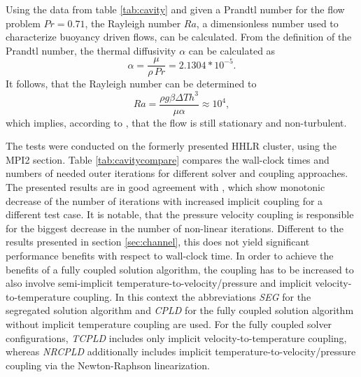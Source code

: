 Using the data from table \ref{tab:cavity} and given a Prandtl number for the flow problem \(Pr = 0.71\), the Rayleigh number \(Ra\), a dimensionless number used to characterize buoyancy driven flows, can be calculated. From the definition of the Prandtl number, the thermal diffusivity \(\alpha\) can be calculated as
\begin{displaymath}
  \alpha = \frac{\mu}{\rho \, Pr} = 2.1304 * 10^{-5}.
\end{displaymath}
It follows, that the Rayleigh number can be determined to 
\begin{displaymath}
  Ra = \frac{\rho g \beta \Delta T h^3}{\mu \alpha} \approx 10^4,
\end{displaymath}
which implies, according to \cite{christon02}, that the flow is still stationary and non-turbulent.

The tests were conducted on the formerly presented HHLR cluster, using the MPI2 section. Table \ref{tab:cavitycompare} compares the wall-clock times and numbers of needed outer iterations for different solver and coupling approaches. The presented results are in good agreement with \cite{vakilipour12}, which show monotonic decrease of the number of iterations with increased implicit coupling for a different test case. It is notable, that the pressure velocity coupling is responsible for the biggest decrease in the number of non-linear iterations. Different to the results presented in section \ref{sec:channel}, this does not yield significant performance benefits with respect to wall-clock time. In order to achieve the benefits of a fully coupled solution algorithm, the coupling has to be increased to also involve semi-implicit temperature-to-velocity/pressure and implicit velocity-to-temperature coupling. In this context the abbreviations \emph{SEG} for the segregated solution algorithm and \emph{CPLD} for the fully coupled solution algorithm without implicit temperature coupling are used. For the fully coupled solver configurations, \emph{TCPLD} includes only implicit velocity-to-temperature coupling, whereas \emph{NRCPLD} additionally includes implicit temperature-to-velocity/pressure coupling via the Newton-Raphson linearization.

